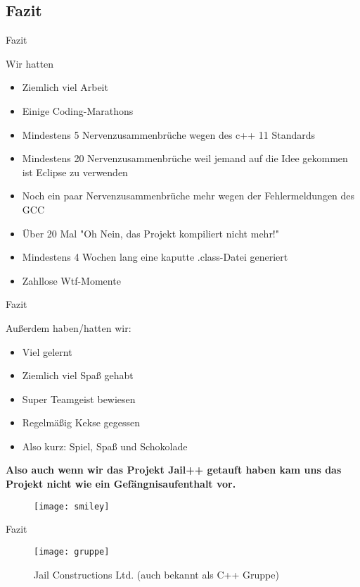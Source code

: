 \subsection{Fazit}

\begin{frame}{Fazit}

	\pause
	Wir hatten
	\pause
	\begin{itemize}
		\item Ziemlich viel Arbeit
		\pause
		\item Einige Coding-Marathons
		\pause
		\item Mindestens 5 Nervenzusammenbr\"uche wegen des c++ 11 Standards
		\pause
		\item Mindestens 20 Nervenzusammenbr\"uche weil jemand auf die Idee gekommen ist Eclipse zu verwenden
		\pause
		\item Noch ein paar Nervenzusammenbr\"uche mehr wegen der Fehlermeldungen des GCC
		\pause
		\item \"Uber 20 Mal "Oh Nein, das Projekt kompiliert nicht mehr!"
		\pause
		\item Mindestens 4 Wochen lang eine kaputte .class-Datei generiert
		\pause
		\item Zahllose Wtf-Momente
	\end{itemize}

\end{frame}

\begin{frame}{Fazit}

	\pause
	Außerdem haben/hatten wir:
	\pause
	\begin{itemize}
		\item Viel gelernt
		\pause
		\item Ziemlich viel Spaß gehabt
		\pause
		\item Super Teamgeist bewiesen
		\pause
		\item Regelm\"aßig Kekse gegessen
		\pause
		\item Also kurz: Spiel, Spaß und Schokolade
		\pause
	\end{itemize} \newline \newline \vspace{5mm}	\textbf{\textcolor{fu-green}{Also auch wenn wir das Projekt Jail++ getauft haben	kam uns das Projekt nicht wie ein Gef\"angnisaufenthalt vor.}}
	
	\begin{figure}
		  \begin{center}
		    \leavevmode
		      \texttt{[image: smiley]}
		  \end{center}
		\end{figure}
	
\end{frame}

\begin{frame}{Fazit}

	\begin{figure}
	  \begin{center}
	    \leavevmode
	      \texttt{[image: gruppe]}
	    \caption{Jail Constructions Ltd. (auch bekannt als C++ Gruppe)}
	  \end{center}
	\end{figure}

\end{frame}